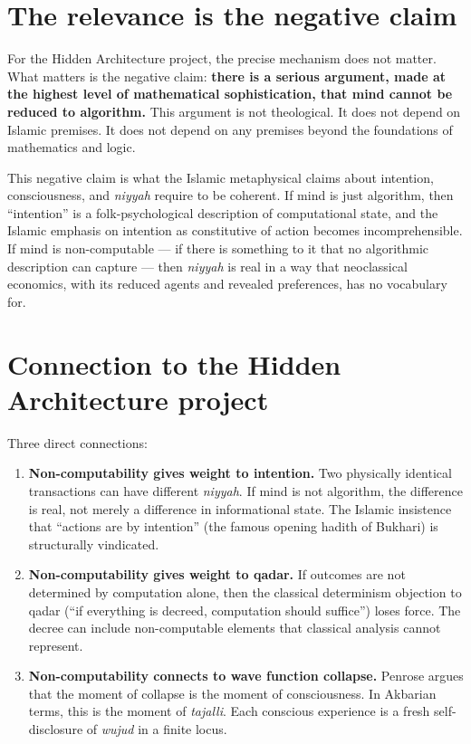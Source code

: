\documentclass[11pt,a4paper]{book}
\theoremstyle{cleanrm}
\begin{document}
\section{The relevance is the negative claim}

For the Hidden Architecture project, the precise mechanism does not
matter. What matters is the negative claim: \textbf{there is a serious
argument, made at the highest level of mathematical sophistication,
that mind cannot be reduced to algorithm.} This argument is not
theological. It does not depend on Islamic premises. It does not
depend on any premises beyond the foundations of mathematics and
logic.

This negative claim is what the Islamic metaphysical claims about
intention, consciousness, and \emph{niyyah} require to be coherent.
If mind is just algorithm, then ``intention'' is a folk-psychological
description of computational state, and the Islamic emphasis on
intention as constitutive of action becomes incomprehensible. If mind
is non-computable --- if there is something to it that no algorithmic
description can capture --- then \emph{niyyah} is real in a way that
neoclassical economics, with its reduced agents and revealed
preferences, has no vocabulary for.

\section{Connection to the Hidden Architecture project}

Three direct connections:

\begin{enumerate}[leftmargin=2em]
    \item \textbf{Non-computability gives weight to intention.}
    Two physically identical transactions can have different
    \emph{niyyah}. If mind is not algorithm, the difference is real,
    not merely a difference in informational state. The Islamic
    insistence that ``actions are by intention'' (the famous opening
    hadith of Bukhari) is structurally vindicated.
    \item \textbf{Non-computability gives weight to qadar.}
    If outcomes are not determined by computation alone, then the
    classical determinism objection to qadar (``if everything is
    decreed, computation should suffice'') loses force. The decree
    can include non-computable elements that classical analysis
    cannot represent.
    \item \textbf{Non-computability connects to wave function
    collapse.} Penrose argues that the moment of collapse is the
    moment of consciousness. In Akbarian terms, this is the moment
    of \emph{tajalli}. Each conscious experience is a fresh
    self-disclosure of \emph{wujud} in a finite locus.
\end{enumerate}
\end{document}
